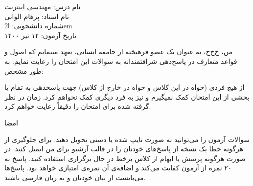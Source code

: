 \documentclass[../main.tex]{subfiles}
\begin{document}
نام درس:‌ مهندسی اینترنت\\
نام استاد:‌ پرهام الوانی\\
شماره دانشجویی:‌ ‌ا{2em}\\
تاریخ آزمون: ۱۴ تیر ۱۴۰۰

من، ‌خ‌خ‌خ، به عنوان یک عضو فرهیخته از جامعه انسانی،
تعهد مینمایم که اصول و قواعد متعارف در پاسخ‌دهی
شرافتمندانه به سوالات این امتحان را رعایت نمایم. به طور مشخص:

     از هیچ فردی (خواه در این کلاس و خواه در خارج از کلاس) جهت پاسخدهی به تمام یا بخشی از
    این امتحان کمک نمیگیرم و نیز به فرد دیگری کمک نخواهم کرد.
     زمان در نظر گرفته شده برای امتحان را دقیقاً رعایت خواهم کرد.

امضا

     سوالات آزمون را می‌توانید به صورت تایپ شده یا دستی تحویل دهید.
     برای جلوگیری از هرگونه خطا یک نسخه از پاسخ‌های خودتان را در قالب آرشیو برای من ایمیل کنید.
     در صورت هرگونه پرسش یا ابهام از کلاس برخط در حال برگزاری استفاده کنید.
     پاسخ به ۲۰ نمره از آزمون کفایت می‌کند و اضافه‌ی آن نمره‌ی امتیازی خواهد بود.
     پاسخ‌ها می‌بایست از بیان خودتان و به زبان فارسی باشند.
\end{document}
